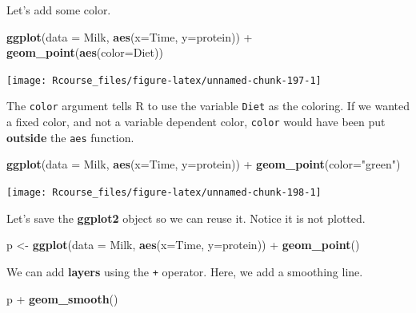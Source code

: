 \documentclass[]{book}
\newenvironment{Shaded}{\begin{snugshade}}{\end{snugshade}}
\newcommand{\KeywordTok}[1]{\textcolor[rgb]{0.13,0.29,0.53}{\textbf{{#1}}}}
\newcommand{\DataTypeTok}[1]{\textcolor[rgb]{0.13,0.29,0.53}{{#1}}}
\newcommand{\StringTok}[1]{\textcolor[rgb]{0.31,0.60,0.02}{{#1}}}
\newcommand{\NormalTok}[1]{{#1}}
\theoremstyle{definition}
\theoremstyle{definition}
\theoremstyle{remark}
\begin{document}
Let's add some color.

\begin{Shaded}
\begin{Highlighting}[]
\KeywordTok{ggplot}\NormalTok{(}\DataTypeTok{data =} \NormalTok{Milk, }\KeywordTok{aes}\NormalTok{(}\DataTypeTok{x=}\NormalTok{Time, }\DataTypeTok{y=}\NormalTok{protein)) +}
\StringTok{  }\KeywordTok{geom_point}\NormalTok{(}\KeywordTok{aes}\NormalTok{(}\DataTypeTok{color=}\NormalTok{Diet))}
\end{Highlighting}
\end{Shaded}

\texttt{[image: Rcourse\_files/figure-latex/unnamed-chunk-197-1]}

The \texttt{color} argument tells R to use the variable \texttt{Diet} as
the coloring. If we wanted a fixed color, and not a variable dependent
color, \texttt{color} would have been put \textbf{outside} the
\texttt{aes} function.

\begin{Shaded}
\begin{Highlighting}[]
\KeywordTok{ggplot}\NormalTok{(}\DataTypeTok{data =} \NormalTok{Milk, }\KeywordTok{aes}\NormalTok{(}\DataTypeTok{x=}\NormalTok{Time, }\DataTypeTok{y=}\NormalTok{protein)) +}
\StringTok{  }\KeywordTok{geom_point}\NormalTok{(}\DataTypeTok{color=}\StringTok{"green"}\NormalTok{)}
\end{Highlighting}
\end{Shaded}

\texttt{[image: Rcourse\_files/figure-latex/unnamed-chunk-198-1]}

Let's save the \textbf{ggplot2} object so we can reuse it. Notice it is
not plotted.

\begin{Shaded}
\begin{Highlighting}[]
\NormalTok{p <-}\StringTok{ }\KeywordTok{ggplot}\NormalTok{(}\DataTypeTok{data =} \NormalTok{Milk, }\KeywordTok{aes}\NormalTok{(}\DataTypeTok{x=}\NormalTok{Time, }\DataTypeTok{y=}\NormalTok{protein)) +}
\StringTok{  }\KeywordTok{geom_point}\NormalTok{()}
\end{Highlighting}
\end{Shaded}

We can add \textbf{layers} using the \texttt{+} operator. Here, we add a
smoothing line.

\begin{Shaded}
\begin{Highlighting}[]
\NormalTok{p +}\StringTok{ }\KeywordTok{geom_smooth}\NormalTok{()}
\end{Highlighting}
\end{Shaded}
\end{document}
